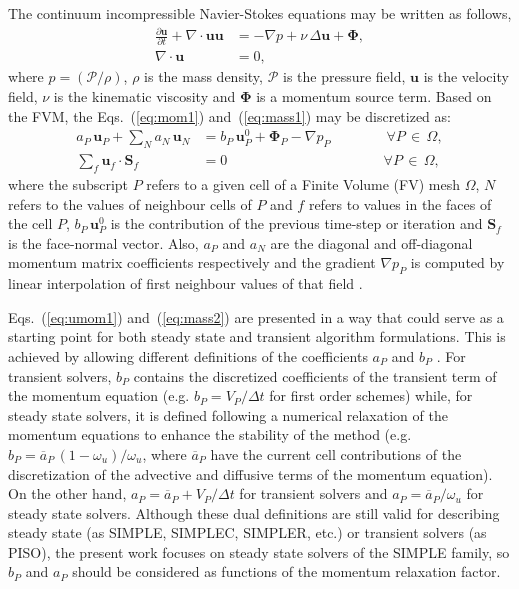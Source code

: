 \documentclass[final,3p,times,11pt,onecolumn]{myElsarticle}
\numberwithin{equation}{section}
\begin{document}
The continuum incompressible Navier-Stokes equations may be written as follows,
\begin{align}
\displaystyle \frac{\partial \boldsymbol{u}}{\partial t} + \nabla \cdotp \boldsymbol{u} \boldsymbol{u} &= -\nabla p + \nu\, \Delta \boldsymbol{u} + \boldsymbol{\Phi},
\label{eq:mom1}
\\
\displaystyle \nabla \cdotp \boldsymbol{u} &= 0, 
\label{eq:mass1}
\end{align}
\noindent where $\displaystyle p = (\mathcal{P}/\rho)$, $\rho$ is the mass density, $\mathcal{P}$ is the pressure field, $\boldsymbol{u}$ is the velocity field, $\nu$ is the kinematic viscosity and $\mathbf{\Phi}$ is a momentum source term.
Based on the FVM, the Eqs.~(\ref{eq:mom1}) and~(\ref{eq:mass1}) may be discretized as:
\begin{align}
a_P\,\boldsymbol{u}_P + \sum_{N} a_{N}\,\boldsymbol{u}_{N} &= b_P\, \boldsymbol{u}^0_P + \boldsymbol{\Phi}_P - \nabla p_P
\qquad \qquad \forall P\,\in\,\Omega,
\label{eq:umom1}
\\
\sum_{f} \boldsymbol{u}_{f} \cdotp \textbf{S}_{f} &= 0
\qquad \qquad \qquad
\qquad \qquad \,\quad \forall P\,\in\,\Omega, 
\label{eq:mass2} 
\end{align}
where the subscript $P$ refers to a given cell of a Finite Volume (FV) mesh $\Omega$, $N$ refers to the values of neighbour cells of $P$ and $f$ refers to values in the faces of the cell $P$, $b_P\, \boldsymbol{u}^0_P$ is the contribution of the previous time-step or iteration and $\textbf{S}_{f}$ is the face-normal vector. Also, $a_P$ and $a_{N}$ are the diagonal and off-diagonal momentum matrix coefficients respectively and the gradient $\nabla p_P$ is computed by linear interpolation of first neighbour values of that field \cite{jasak, moukalled, marquez}. 

Eqs.~(\ref{eq:umom1}) and~(\ref{eq:mass2}) are presented in a way that could serve as a starting point for both steady state and transient algorithm formulations. This is achieved by allowing different definitions of the coefficients $a_P$ and $b_P$ \cite{issa2}. For transient solvers, $b_P$ contains the discretized coefficients of the transient term of the momentum equation (e.g. $b_P = V_P/\Delta t$ for first order schemes) while, for steady state solvers, it is defined following a numerical relaxation of the momentum equations to enhance the stability of the method \cite{moukalled} (e.g. $b_P = \overline{a}_P\,(1-\omega_u)/\omega_u $, where $\overline{a}_P$ have the current cell contributions of the discretization of the advective and diffusive terms of the momentum equation). On the other hand, $a_P = \overline{a}_P + V_P/\Delta t$ for transient solvers and $a_P = \overline{a}_P/\omega_u$ for steady state solvers. Although these dual definitions are still valid for describing steady state (as SIMPLE, SIMPLEC, SIMPLER, etc.) or transient solvers (as PISO), the present work focuses on steady state solvers of the SIMPLE family, so $b_P$ and $a_P$ should be considered as functions of the momentum relaxation factor.
\end{document}
